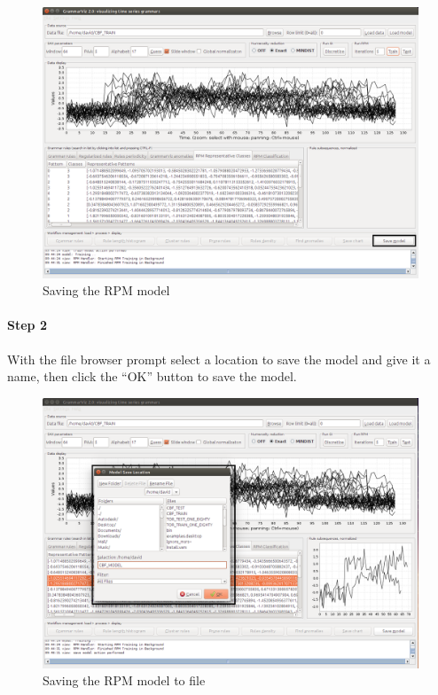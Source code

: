 \documentclass[letterpaper, 12pt]{article}
\begin{document}
\begin{figure}[H]
  \includegraphics[width=\textwidth]{grammarviz-save-model-step-1}
  \caption{Saving the RPM model}
  \label{fig:grammarviz-save-model-step-1}
\end{figure}

\newpage
\paragraph{Step 2}
With the file browser prompt select a location to save the model and give it a name, then click the ``OK'' button to save the model.

\begin{figure}[H]
  \includegraphics[width=\textwidth]{grammarviz-save-model-step-2}
  \caption{Saving the RPM model to file}
  \label{fig:grammarviz-save-model-step-2}
\end{figure}
\end{document}
